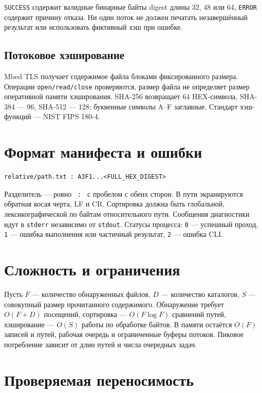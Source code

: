 \documentclass[12pt,a4paper]{article}
\begin{document}
\texttt{SUCCESS} содержит валидные бинарные байты digest длины 32, 48 или 64,
\texttt{ERROR} содержит причину отказа. Ни один поток не должен печатать
незавершённый результат или использовать фиктивный хэш при ошибке.

\subsection{Потоковое хэширование}

Mbed TLS получает содержимое файла блоками фиксированного размера. Операции
\texttt{open/read/close} проверяются, размер файла не определяет размер
оперативной памяти хэширования. SHA-256 возвращает 64 HEX-символа,
SHA-384 --- 96, SHA-512 --- 128; буквенные символы A--F заглавные.
Стандарт хэш-функций --- NIST FIPS 180-4.

\section{Формат манифеста и ошибки}

\begin{lstlisting}
relative/path.txt : A3F1...<FULL_HEX_DIGEST>
\end{lstlisting}

Разделитель --- ровно \texttt{~:~} с пробелом с обеих сторон. В пути
экранируются обратная косая черта, LF и CR. Сортировка должна быть глобальной,
лексикографической по байтам относительного пути. Сообщения диагностики идут
в \texttt{stderr} независимо от \texttt{stdout}. Статусы процесса:
\texttt{0} --- успешный проход, \texttt{1} --- ошибка выполнения или
частичный результат, \texttt{2} --- ошибка CLI.

\section{Сложность и ограничения}

Пусть $F$ --- количество обнаруженных файлов, $D$ --- количество каталогов,
$S$ --- совокупный размер прочитанного содержимого. Обнаружение требует
$O(F+D)$ посещений, сортировка --- $O(F\log F)$ сравнений путей,
хэширование --- $O(S)$ работы по обработке байтов. В памяти остаётся
$O(F)$ записей и путей, рабочая очередь и ограниченные буферы потоков.
Пиковое потребление зависит от длин путей и числа очередных задач.

\section{Проверяемая переносимость}
\end{document}
